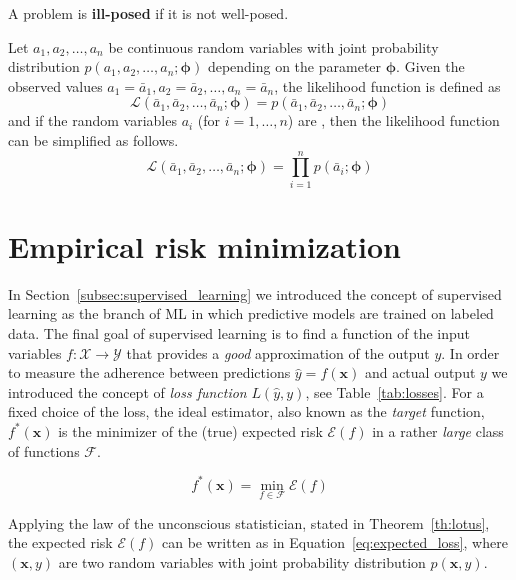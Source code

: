 \begin{definition} \label{def:ill_posed}
	A problem is \textbf{ill-posed} if it is not well-posed.
\end{definition}

\begin{definition} \label{def:likelihood}
	Let $a_1, a_2, \dots, a_n$ be continuous random variables with joint probability distribution $p(a_1, a_2, \dots, a_n; \bm{\phi})$ depending on the parameter $\bm{\phi}$. Given the observed values $a_1=\bar a_1, a_2 = \bar a_2, \dots, a_n = \bar a_n$, the likelihood function is defined as
	$$\mathcal{L}(\bar a_1, \bar a_2, \dots, \bar a_n; \bm{\phi}) = p(\bar a_1, \bar a_2, \dots, \bar a_n; \bm{\phi})$$
	and if the random variables $a_i$ (for $i=1,\dots,n$) are , then the likelihood function can be simplified as follows.
	$$\mathcal{L}(\bar a_1, \bar a_2, \dots, \bar a_n; \bm{\phi}) = \prod_{i=1}^n p(\bar a_i; \bm{\phi})$$
\end{definition}


\section{Empirical risk minimization} \label{sec:erm}
In Section~\ref{subsec:supervised_learning} we introduced the concept of supervised learning as the branch of ML in which predictive models are trained on labeled data. The final goal of supervised learning is to find a function of the input variables $f: \mathcal{X} \rightarrow \mathcal{Y}$ that provides a \textit{good} approximation of the output $y$. In order to measure the adherence between predictions $\hat y = f(\bm{x})$ and actual output $y$ we introduced the concept of \textit{loss function} $L(\hat y, y)$, see Table~\ref{tab:losses}. For a fixed choice of the loss, the ideal estimator, also known as the \textit{target} function, $f^*(\bm{x})$ is the minimizer of the (true) expected risk $\mathcal{E}(f)$ in a rather \textit{large} class of functions $\mathcal{F}$.


\begin{equation} \label{eq:fstar}
	f^*(\bm{x}) = \min_{f \in \mathcal{F}}{\mathcal{E}(f)}
\end{equation}

Applying the law of the unconscious statistician, stated in Theorem~\ref{th:lotus}, the expected risk $\mathcal{E}(f)$ can be written as in Equation~\eqref{eq:expected_loss}, where $(\bm{x},y)$ are two random variables with joint probability distribution $p(\bm{x},y)$.

